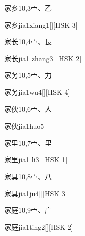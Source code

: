 \begin{entry}{家乡}{10,3}{⼧、⼄}
  \begin{phonetics}{家乡}{jia1xiang1}[][HSK 3]
  \end{phonetics}
\end{entry}

\begin{entry}{家长}{10,4}{⼧、⾧}
  \begin{phonetics}{家长}{jia1 zhang3}[][HSK 2]
  \end{phonetics}
\end{entry}

\begin{entry}{家务}{10,5}{⼧、⼒}
  \begin{phonetics}{家务}{jia1wu4}[][HSK 4]
  \end{phonetics}
\end{entry}

\begin{entry}{家伙}{10,6}{⼧、⼈}
  \begin{phonetics}{家伙}{jia1huo5}
  \end{phonetics}
\end{entry}

\begin{entry}{家里}{10,7}{⼧、⾥}
  \begin{phonetics}{家里}{jia1 li3}[][HSK 1]
  \end{phonetics}
\end{entry}

\begin{entry}{家具}{10,8}{⼧、⼋}
  \begin{phonetics}{家具}{jia1ju4}[][HSK 3]
  \end{phonetics}
\end{entry}

\begin{entry}{家庭}{10,9}{⼧、⼴}
  \begin{phonetics}{家庭}{jia1ting2}[][HSK 2]
  \end{phonetics}
\end{entry}

